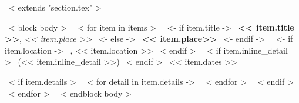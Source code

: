 ~< extends "section.tex" >~

~< block body >~
~< for item in items >~
    ~<- if item.title ->~
    \textbf{<< item.title >>}, \emph{<< item.place >>}
    ~<- else ->~
    \textbf{<< item.place>>}
    ~<- endif ->~
    ~<- if item.location ->~
    , << item.location >>
    ~< endif >~
    ~< if item.inline_detail >~
    {\footnotesize \color{gray} (<< item.inline_detail >>)}
    ~< endif >~
    \hfill << item.dates >> \par
    ~< if item.details >~
        ~< for detail in item.details ->~
        ~< endfor >~
    ~< endif >~
    \vspace{3mm}
~< endfor >~
~< endblock body >~